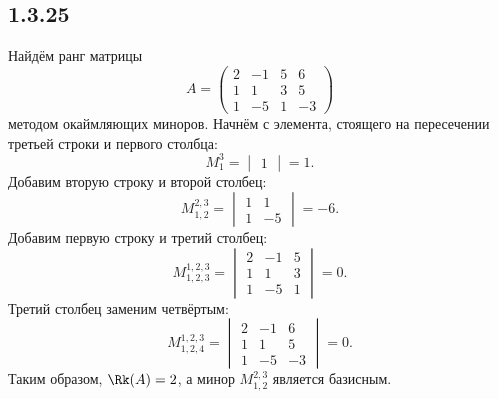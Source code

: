 \subsection{1.3.25}

Найдём ранг матрицы
\[
A=
\begin{pmatrix}
	2 & -1 & 5 & 6 \\
	1 & 1 & 3 & 5 \\
	1& -5 & 1 & -3
\end{pmatrix}
\]
методом окаймляющих миноров. Начнём с элемента, стоящего на пересечении третьей строки и первого столбца:
\[
M_1^3=
\begin{vmatrix}
	1
\end{vmatrix}
=1.
\]
Добавим вторую строку и второй столбец:
\[
M_{1, 2}^{2,3}=
\begin{vmatrix}
	1 & 1 \\
	1 & -5
\end{vmatrix}
=-6.
\]
Добавим первую строку и третий столбец:
\[
M_{1, 2, 3}^{1, 2, 3}=
\begin{vmatrix}
	2 & -1 & 5 \\
	1 & 1 & 3 \\
	1& -5 & 1
\end{vmatrix}
=0.
\]
Третий столбец заменим четвёртым:
\[
M_{1, 2, 4}^{1, 2, 3}=
\begin{vmatrix}
	2 & -1 & 6 \\
	1 & 1 & 5 \\
	1& -5 & -3
\end{vmatrix}
=0.
\]
Таким образом, $\Rk(A)=2$, а минор $M_{1, 2}^{2,3}$ является базисным.